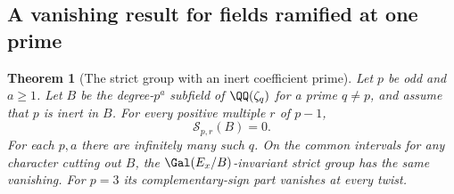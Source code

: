 \documentclass[a4paper,11pt]{article}
\newtheorem{theorem}[proposition]{Theorem}
\theoremstyle{definition}
\theoremstyle{remark}
\numberwithin{equation}{section}
\begin{document}
\subsection{A vanishing result for fields ramified at one prime}\label{nav:III-51}
\begin{theorem}[The strict group with an inert coefficient prime]\leavevmode
\label{thm:oneprime278}
Let \(p\) be odd and \(a\ge1\). Let \(B\) be the degree-\(p^a\)
subfield of \(\QQ(\zeta_q)\) for a prime \(q\ne p\), and assume
that \(p\) is inert in \(B\). For every positive multiple \(r\)
of \(p-1\),
\[
                       \mathcal S_{p,r}(B)=0 .
\]
For each \(p,a\) there are infinitely many such \(q\).
On the common intervals for any character cutting out \(B\),
the \(\Gal(E_x/B)\)-invariant strict group has the same vanishing.
For \(p=3\) its complementary-sign part vanishes at every twist.
\end{theorem}
\end{document}
